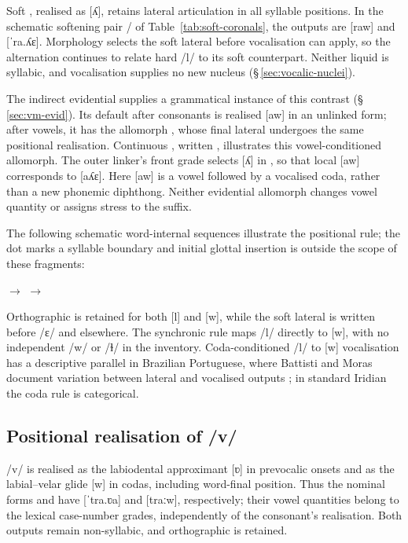Soft , realised as [ʎ], retains lateral articulation in all
syllable positions. In the schematic softening pair /
of Table~\ref{tab:soft-coronals}, the outputs are [raw] and [ˈra.ʎɛ].
Morphology selects the soft lateral before vocalisation can apply, so the
alternation continues to relate hard /l/ to its soft counterpart. Neither
liquid is syllabic, and vocalisation supplies no new nucleus
(§\,\ref{sec:vocalic-nuclei}).

The indirect evidential supplies a grammatical instance of this contrast
(§\,\ref{sec:vm-evid}). Its default  after consonants is
realised [aw] in an unlinked form; after vowels, it has the allomorph
, whose final lateral undergoes the same positional realisation.
Continuous , written ,
illustrates this vowel-conditioned allomorph. The outer linker's front
grade selects [ʎ] in , so that
local  [aw] corresponds to  [aʎɛ]. Here
[aw] is a vowel followed by a vocalised coda, rather than a new phonemic
diphthong. Neither evidential allomorph changes vowel quantity or assigns
stress to the suffix.

The following schematic word-internal sequences illustrate the positional
rule; the dot marks a syllable boundary and initial glottal insertion is
outside the scope of these fragments:

\begin{center}
 $\rightarrow$ \ipagloss{[aw.ta]}\qquad
{} $\rightarrow$ \ipagloss{[a.la]}
\end{center}

Orthographic  is retained for both [l] and [w], while the soft
lateral is written  before /ɛ/ and  elsewhere. The synchronic rule maps /l/ directly
to [w], with no independent /w/ or /ɫ/ in the inventory. Coda-conditioned /l/ to [w]
vocalisation has a descriptive parallel in Brazilian Portuguese, where
Battisti and Moras document variation between lateral and vocalised outputs
\cite{battistimoras2016}; in standard Iridian the coda rule is
categorical.

\subsection{Positional realisation of /v/}\label{sec:v-realisation}

/v/ is realised as the labiodental approximant [ʋ] in prevocalic onsets and
as the labial--velar glide [w] in codas, including word-final position.
Thus the nominal forms  and  have [ˈtra.ʋa] and
[traːw], respectively; their vowel quantities belong to the lexical
case-number grades, independently of the consonant's realisation. Both
outputs remain non-syllabic, and orthographic  is retained.

